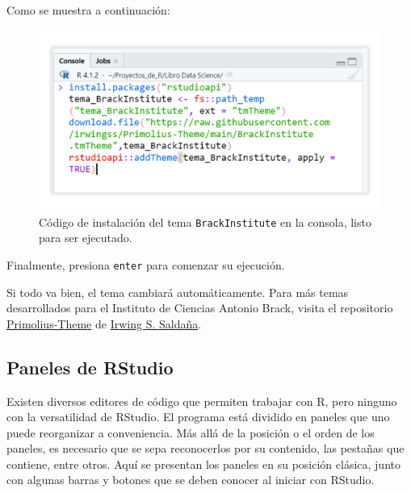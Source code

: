 \documentclass[
]{article}
\theoremstyle{definition}
\theoremstyle{definition}
\theoremstyle{definition}
\theoremstyle{definition}
\theoremstyle{remark}
\begin{document}
Como se muestra a continuación:



\begin{figure}

{\centering \includegraphics[width=1\linewidth]{figs/screenshots/tema en consola} 

}

\caption{Código de instalación del tema \texttt{BrackInstitute} en la consola, listo para ser ejecutado.}\label{fig:figura13}
\end{figure}

Finalmente, presiona \texttt{enter} para comenzar su ejecución.

Si todo va bien, el tema cambiará automáticamente. Para más temas desarrollados para el Instituto de Ciencias Antonio Brack, visita el repositorio \href{https://github.com/irwingss/Primolius-Theme}{Primolius-Theme} de \href{https://github.com/irwingss}{Irwing S. Saldaña}.

\hypertarget{panelesRStudio}{%
\subsection{Paneles de RStudio}\label{panelesRStudio}}

Existen diversos editores de código que permiten trabajar con R, pero ninguno con la versatilidad de RStudio. El programa está dividido en paneles que uno puede reorganizar a conveniencia. Más allá de la posición o el orden de los paneles, es necesario que se sepa reconocerlos por su contenido, las pestañas que contiene, entre otros. Aquí se presentan los paneles en su posición clásica, junto con algunas barras y botones que se deben conocer al iniciar con RStudio.
\end{document}
